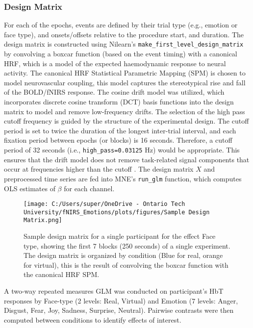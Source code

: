 \subsubsection{Design Matrix}
For each of the epochs, events are defined by their trial type (e.g., emotion or face type), and onsets/offsets relative to the procedure start, and duration.
The design matrix is constructed using Nilearn's \texttt{make\_first\_level\_design\_matrix} by convolving a boxcar function (based on the event timing) with a canonical HRF, which is a model of the expected haemodynamic response to neural activity.
The canonical HRF Statistical Parametric Mapping (SPM) \citep{friston_statistical_2007} is chosen to model neurovascular coupling, this model captures the stereotypical rise and fall of the BOLD/fNIRS response. 
The cosine drift model was utilized, which incorporates discrete cosine transform (DCT) basis functions into the design matrix to model and remove low-frequency drifts.
The selection of the high pass cutoff frequency is guided by the structure of the experimental design. 
The cutoff period is set to twice the duration of the longest inter-trial interval, and each fixation period between epochs (or blocks) is 16 seconds. 
Therefore, a cutoff period of 32 seconds (i.e., \texttt{high\_pass=0.03125} Hz) would be appropriate. 
This ensures that the drift model does not remove task-related signal components that occur at frequencies higher than the cutoff \citep{luke_analysis_2021}.
The design matrix \( X \) and preprocessed time series are fed into MNE's \texttt{run\_glm} function, which computes OLS estimates of \( \beta \) for each channel.

\begin{figure}[H]
    \centering
    \texttt{[image: C:/Users/super/OneDrive - Ontario Tech University/fNIRS\_Emotions/plots/figures/Sample Design Matrix.png]}
    \caption[Sample design matrix for GLM]{Sample design matrix for a single participant for the effect Face type, showing the first 7 blocks (250 seconds) of a single experiment.
    The design matrix is organized by condition (Blue for real, orange for virtual), this is the result of convolving the boxcar function with the canonical HRF SPM. }
    \label{fig:design_matrix}
\end{figure}

A two-way repeated measures GLM was conducted on participant's HbT responses by Face-type (2 levels: Real, Virtual) and Emotion (7 levels: Anger, Disgust, Fear, Joy, Sadness, Surprise, Neutral). 
Pairwise contrasts were then computed between conditions to identify effects of interest.

